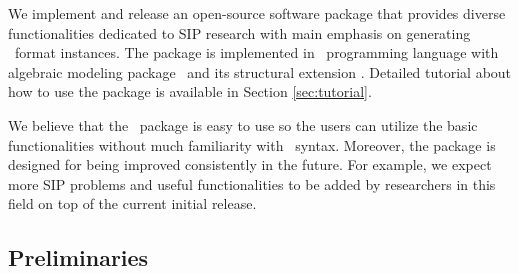 We implement and release an open-source software package that provides diverse functionalities dedicated to SIP research with main emphasis on generating \smps\ format instances. The package is implemented in \julia\ programming language with algebraic modeling package \jump\ and its structural extension \structjump. Detailed tutorial about how to use the package is available in Section \ref{sec:tutorial}. 

We believe that the \siplibtwo\ package is easy to use so the users can utilize the basic functionalities without much familiarity with \julia\ syntax. Moreover, the package is designed for being improved consistently in the future. For example, we expect more SIP problems and useful functionalities to be added by researchers in this field on top of the current initial release.
\subsection{Preliminaries}
